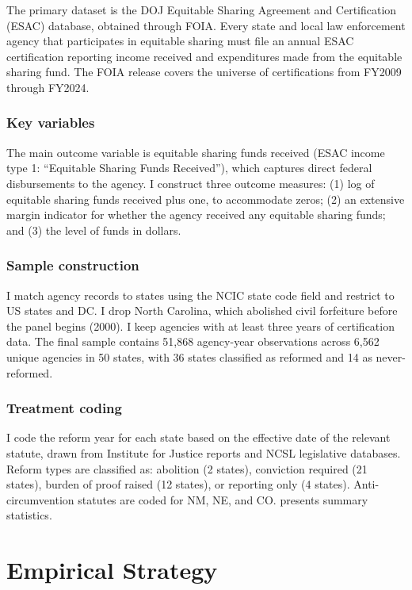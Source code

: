 \documentclass[12pt]{article}
\begin{document}
The primary dataset is the DOJ Equitable Sharing Agreement and Certification (ESAC) database, obtained through FOIA. Every state and local law enforcement agency that participates in equitable sharing must file an annual ESAC certification reporting income received and expenditures made from the equitable sharing fund. The FOIA release covers the universe of certifications from FY2009 through FY2024.

\subsubsection*{Key variables} The main outcome variable is equitable sharing funds received (ESAC income type 1: ``Equitable Sharing Funds Received''), which captures direct federal disbursements to the agency. I construct three outcome measures: (1) log of equitable sharing funds received plus one, to accommodate zeros; (2) an extensive margin indicator for whether the agency received any equitable sharing funds; and (3) the level of funds in dollars.

\subsubsection*{Sample construction} I match agency records to states using the NCIC state code field and restrict to US states and DC. I drop North Carolina, which abolished civil forfeiture before the panel begins (2000). I keep agencies with at least three years of certification data. The final sample contains 51,868 agency-year observations across 6,562 unique agencies in 50 states, with 36 states classified as reformed and 14 as never-reformed.

\subsubsection*{Treatment coding} I code the reform year for each state based on the effective date of the relevant statute, drawn from Institute for Justice reports and NCSL legislative databases. Reform types are classified as: abolition (2 states), conviction required (21 states), burden of proof raised (12 states), or reporting only (4 states). Anti-circumvention statutes are coded for NM, NE, and CO.  presents summary statistics.



\section{Empirical Strategy}\label{sec:method}
\end{document}
